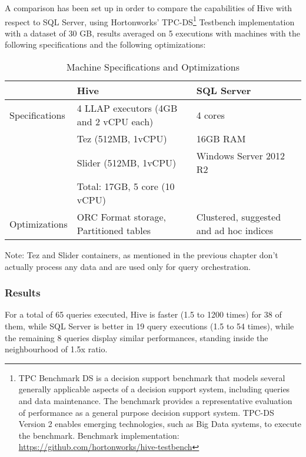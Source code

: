 A comparison has been set up in order to compare the capabilities of Hive with respect to SQL Server, using Hortonworks' TPC-DS\footnote{TPC Benchmark DS is a decision support benchmark that models several generally applicable aspects of a decision support system, including queries and data maintenance. The benchmark provides a representative evaluation of performance as a general purpose decision support system. TPC-DS Version 2 enables emerging technologies, such as Big Data systems, to execute the benchmark. Benchmark implementation: \href{https://github.com/hortonworks/hive-testbench}{https://github.com/hortonworks/hive-testbench}} Testbench implementation with a dataset of 30 GB, results averaged on 5 executions with machines with the following specifications and the following optimizations:
\newline

\begin{table}[!htb]
    \caption{Machine Specifications and Optimizations}
\begin{center}
    \begin{tabular}{|l|p{6cm}|p{5cm}|}
        \hline
        & Hive & SQL Server \\ \hline
        Specifications & 4 LLAP executors (4GB and 2 vCPU each) & 4 cores\\
        & Tez (512MB, 1vCPU) & 16GB RAM\\
        & Slider (512MB, 1vCPU) & Windows Server 2012 R2 \\
        & Total: 17GB, 5 core (10 vCPU) & \\ \hline    
        Optimizations & ORC Format storage, Partitioned tables & Clustered, suggested and ad hoc indices\\ \hline      
    \end{tabular}
\end{center}
\end{table}


Note: Tez and Slider containers, as mentioned in the previous chapter don't actually process any data and are used only for query orchestration.

\subsubsection{Results}

For a total of 65 queries executed, Hive is faster (1.5 to 1200 times) for 38 of them, while SQL Server is better in 19 query executions (1.5 to 54 times), while the remaining 8 queries display similar performances, standing inside the neighbourhood of 1.5x ratio.

